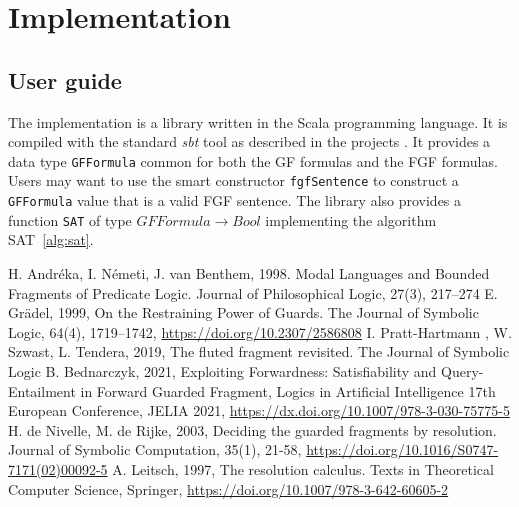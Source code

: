 \documentclass[english, shortabstract]{iithesis}
\theoremstyle{definition} \newtheorem{definition}{Definition}[chapter]
\theoremstyle{remark} \newtheorem{remark}[definition]{Observation}
\theoremstyle{plain} \newtheorem{theorem}[definition]{Theorem}
\theoremstyle{plain} \newtheorem{lemma}[definition]{Lemma}
\begin{document}
\chapter{Implementation}

\section{User guide}

The implementation is a library written in the Scala programming language. It is compiled with the standard \emph{sbt} tool as described in the projects . 
It provides a data type \texttt{GFFormula} common for both the GF formulas and the FGF formulas.
Users may want to use the smart constructor \texttt{fgfSentence} to construct a \texttt{GFFormula} value that is a valid FGF sentence.
The library also provides a function \texttt{SAT} of type $\mathit{GFFormula} \rightarrow \mathit{Bool}$
implementing the algorithm SAT~\ref{alg:sat}.


\begin{thebibliography}{1}
 H. Andréka, I. Németi, J. van Benthem, 1998. Modal Languages and Bounded Fragments of Predicate Logic. Journal of Philosophical Logic, 27(3), 217--274
 E. Grädel, 1999, On the Restraining Power of Guards. The Journal of Symbolic Logic, 64(4), 1719--1742, \url{https://doi.org/10.2307/2586808}
 I. Pratt-Hartmann , W. Szwast, L. Tendera, 2019, The fluted fragment revisited. The Journal of Symbolic Logic
 B. Bednarczyk, 2021, Exploiting Forwardness: Satisfiability and Query-Entailment in Forward Guarded Fragment, Logics in Artificial Intelligence 17th European Conference, JELIA 2021, \url{https://dx.doi.org/10.1007/978-3-030-75775-5}
 H. de Nivelle, M. de Rijke, 2003, Deciding the guarded fragments by resolution. Journal of Symbolic Computation, 35(1), 21-58, \url{https://doi.org/10.1016/S0747-7171(02)00092-5}
 A. Leitsch, 1997, The resolution calculus. Texts in Theoretical Computer Science, Springer, \url{https://doi.org/10.1007/978-3-642-60605-2}
\end{thebibliography}

\end{document}
